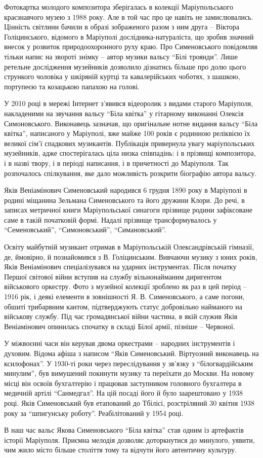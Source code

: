 Фотокартка молодого композитора зберігалась в колекції Маріупольського
краєзнавчого музею з 1988 року. Але в той час про це навіть не замислювались.
Цінність світлини бачили в образі зображеного разом з ним друга – Віктора
Голіцинського, відомого в Маріуполі дослідника-натураліста, що зробив значний
внесок у розвиток природоохоронного руху краю. Про Сименовського повідомляв
тільки напис на звороті знімку – автор музики вальсу \enquote{Білі троянди}. Лише
ретельне дослідження музейників дозволило дізнатись більше про долю цього
стрункого чоловіка у шкіряній куртці та кавалерійських чоботях, з шашкою,
портупеєю та козацькою папахою на голові.

У 2010 році в мережі Інтернет з'явився відеоролик з видами старого Маріуполя,
накладеними на звучання вальсу \enquote{Біла квітка} у гітарному виконанні
Олексія Симоновського. Виконавець зазначав, що оригінальне нотне видання вальсу
\enquote{Біла квітка}, написаного у Маріуполі, вже майже 100 років є родинною
реліквією їх великої сім'ї спадкових музикантів. Публікація привернула увагу
маріупольських музейників, адже спостерігалась ціла низка співпадінь: і в
прізвищі композитора, і в назві твору, і в періоді написання, і в причетності
до Маріуполя. Так розпочалось спілкування, яке дало можливість розкрити
біографію автора вальсу.

Яків Веніамінович Сименовський народився 6 грудня 1890 року в Маріуполі в
родині міщанина Зельмана Сименовського та його дружини Клори. До речі, в
записах метричної книги Маріупольської синагоги прізвище родини зафіксоване
саме в такій початковій формі. Надалі прізвище трансформувалось у
\enquote{Семеновський}, \enquote{Симоновський}, \enquote{Симановський}.

Освіту майбутній музикант отримав в Маріупольській Олександрівській гімназії,
де, ймовірно, й познайомився з В. Голіцинським. Вивчаючи музику з юних років,
Яків Веніамінович спеціалізувався на ударних інструментах. Після початку Першої
світової війни вступив на службу вільнонайманим диригентом військового
оркестру. Фото з музейної колекції зроблено як раз в цей період – 1916 рік, і
деякі елементи в зовнішності Я. В. Сименовського, а саме погони, обшиті
трибарвним кантом, підтверджують статус добровільно найманого на військову
службу. Під час громадянської війни частина, в якій служив Яків Веніамінович
опинилась спочатку в складі Білої армії, пізніше – Червоної.

У міжвоєнні часи він керував двома оркестрами – народних інструментів і
духовим. Відома афіша з написом \enquote{Яків Сименовський. Віртуозний виконавець на
ксилофонах}. У 1930-ті роки через переслідування у зв'язку з \enquote{білогвардійським
минулим}, був вимушений покинути музику та переїхати до Москви. На новому місці
він освоїв бухгалтерію і працював заступником головного бухгалтера в медичній
артілі \enquote{Санмедгал}. На цій посаді його й було заарештовано у 1938 році. Яків
Сименовський був етапований до Тбілісі, розстріляний 30 квітня 1938 року за
\enquote{шпигунську роботу}. Реабілітований у 1954 році.

В наш час вальс Якова Сименовського \enquote{Біла квітка} став одним із артефактів
історії Маріуполя. Приємна мелодія дозволяє доторкнутися до минулого, уявити,
чим жило місто більше століття тому та відчути його автентичну культуру.
